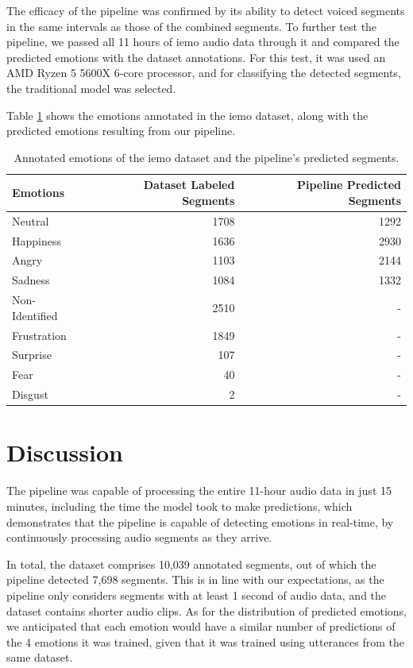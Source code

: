 The efficacy of the pipeline was confirmed by its ability to detect voiced segments in the same intervals as those of the combined segments. To further test the pipeline, we passed all 11 hours of \ac{iemo} audio data through it and compared the predicted emotions with the dataset annotations. For this test, it was used an AMD Ryzen 5 5600X 6-core processor, and for classifying the detected segments, the traditional model was selected.

Table \ref{tab:iemopipeline} shows the emotions annotated in the \ac{iemo} dataset, along with the predicted emotions resulting from our pipeline.

\begin{table}[H]
	\centering
	\caption{Annotated emotions of the \ac{iemo} dataset and the pipeline's predicted segments.}
	\label{tab:iemopipeline}
	\begin{tabular}{lrr}
		\toprule
		Emotions & Dataset Labeled Segments & Pipeline Predicted Segments \\
		\midrule
		Neutral & 1708 & 1292 \\
		Happiness & 1636 & 2930 \\
		Angry & 1103 & 2144 \\
		Sadness & 1084 & 1332 \\
		Non-Identified & 2510 & - \\
		Frustration & 1849 & - \\
		Surprise	& 107 & - \\
		Fear & 40 & - \\
		Disgust & 2 & - \\
		\bottomrule
	\end{tabular}
\end{table}

\section{Discussion}

The pipeline was capable of processing the entire 11-hour audio data in just 15 minutes, including the time the model took to make predictions, which demonstrates that the pipeline is capable of detecting emotions in real-time, by continuously processing audio segments as they arrive.

In total, the dataset comprises 10,039 annotated segments, out of which the pipeline detected 7,698 segments. This is in line with our expectations, as the pipeline only considers segments with at least 1 second of audio data, and the dataset contains shorter audio clips. As for the distribution of predicted emotions, we anticipated that each emotion would have a similar number of predictions of the 4 emotions it was trained, given that it was trained using utterances from the same dataset.

